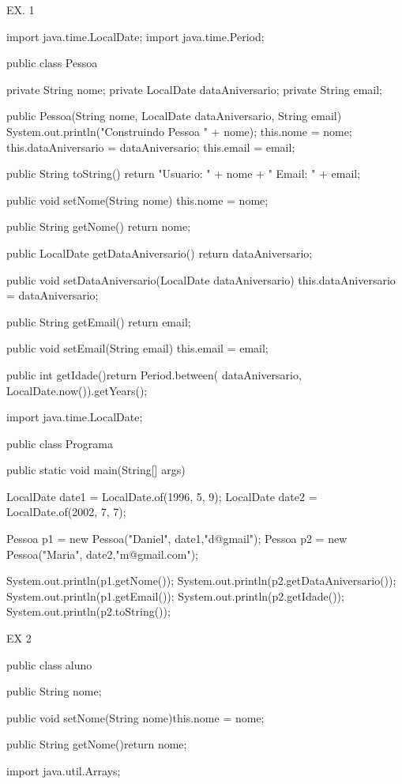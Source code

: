 EX. 1

import java.time.LocalDate;
import java.time.Period;

public class Pessoa{

	private String nome;
	private LocalDate dataAniversario;
	private String email;


	public Pessoa(String nome, LocalDate dataAniversario, String email) {
		System.out.println("Construindo Pessoa " + nome);
		this.nome = nome;
		this.dataAniversario = dataAniversario;
		this.email = email;
	}

	public String toString(){ return "Usuario: " + nome + " Email: " + email;}

	public void setNome(String nome) { this.nome = nome; }

	public String getNome() { return nome; }

	public LocalDate getDataAniversario() {return dataAniversario;}

	public void setDataAniversario(LocalDate dataAniversario) { this.dataAniversario = dataAniversario; }

	public String getEmail() { return email; }

	public void setEmail(String email) { this.email = email; }

	public int getIdade(){return Period.between( dataAniversario, LocalDate.now()).getYears();}
	
}

import java.time.LocalDate;

public class Programa {

	public static void main(String[] args) {

		LocalDate date1 = LocalDate.of(1996, 5, 9);  
		LocalDate date2 = LocalDate.of(2002, 7, 7);

		Pessoa p1 = new Pessoa("Daniel", date1,"d@gmail");
		Pessoa p2 = new Pessoa("Maria",  date2,"m@gmail.com");
		
		System.out.println(p1.getNome());
		System.out.println(p2.getDataAniversario());
		System.out.println(p1.getEmail());
		System.out.println(p2.getIdade());
		System.out.println(p2.toString());
	}

}

EX 2

public class aluno{
	public String nome;

	public void setNome(String nome){this.nome = nome;}

	public String getNome(){return nome;}
}

import java.util.Arrays;

